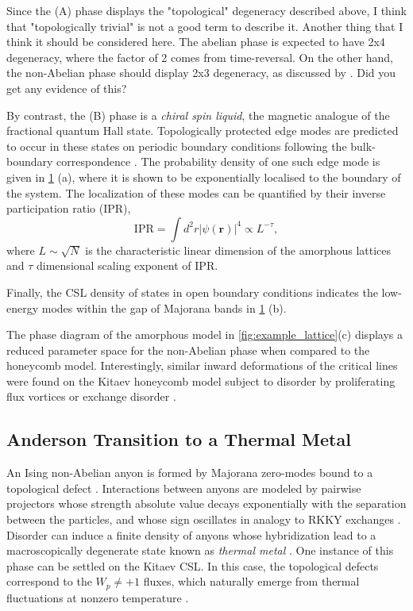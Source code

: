 Since the (A) phase displays the "topological" degeneracy described
above, I think that "topologically trivial" is not a good term to
describe it. Another thing that I think it should be considered here.
The abelian phase is expected to have 2x4 degeneracy, where the factor
of 2 comes from time-reversal. On the other hand, the non-Abelian phase
should display 2x3 degeneracy, as discussed by
\autocite{yaoExactChiralSpin2007}. Did you get any evidence of this?

By contrast, the (B) phase is a \emph{chiral spin liquid}, the magnetic
analogue of the fractional quantum Hall state. Topologically protected
edge modes are predicted to occur in these states on periodic boundary
conditions following the bulk-boundary correspondence
\autocite{qi_general_2006}. The probability density of one such edge
mode is given in \protect\hyperlink{fig:edge_modes}{1} (a), where it is
shown to be exponentially localised to the boundary of the system. The
localization of these modes can be quantified by their inverse
participation ratio (IPR),
\[\mathrm{IPR} = \int d^2r|\psi(\mathbf{r})|^4  \propto L^{-\tau},\]
where \(L\sim\sqrt{N}\) is the characteristic linear dimension of the
amorphous lattices and \(\tau\) dimensional scaling exponent of IPR.

Finally, the CSL density of states in open boundary conditions indicates
the low-energy modes within the gap of Majorana bands in
\protect\hyperlink{fig:edge_modes}{1} (b).

The phase diagram of the amorphous model in
\protect\hyperlink{fig:example_lattice}{{[}fig:example\_lattice{]}}(c)
displays a reduced parameter space for the non-Abelian phase when
compared to the honeycomb model. Interestingly, similar inward
deformations of the critical lines were found on the Kitaev honeycomb
model subject to disorder by proliferating flux vortices
\autocite{Nasu_Thermal_2015} or exchange disorder
\autocite{knolle_dynamics_2016}.

\hypertarget{anderson-transition-to-a-thermal-metal}{%
\subsection{Anderson Transition to a Thermal
Metal}\label{anderson-transition-to-a-thermal-metal}}

An Ising non-Abelian anyon is formed by Majorana zero-modes bound to a
topological defect \autocite{Beenakker2013}. Interactions between anyons
are modeled by pairwise projectors whose strength absolute value decays
exponentially with the separation between the particles, and whose sign
oscillates in analogy to RKKY exchanges
\autocite{Laumann2012,Lahtinen_2011,lahtinenTopologicalLiquidNucleation2012}.
Disorder can induce a finite density of anyons whose hybridization lead
to a macroscopically degenerate state known as \emph{thermal metal}
\autocite{Laumann2012}. One instance of this phase can be settled on the
Kitaev CSL. In this case, the topological defects correspond to the
\(W_p \neq +1\) fluxes, which naturally emerge from thermal fluctuations
at nonzero temperature \autocite{selfThermallyInducedMetallic2019}.

